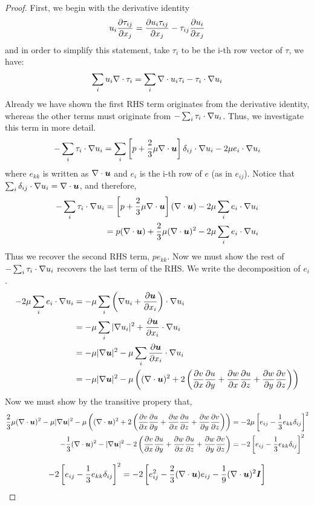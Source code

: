 \documentclass{article}
\begin{document}
\begin{proof}
    First, we begin with the derivative identity
    \begin{gather*}
        u_i\frac{\partial \tau_{ij}}{\partial x_j} = \frac{\partial u_i\tau_{ij}}{\partial x_j} - \tau_{ij}\frac{\partial u_i}{\partial x_j}
    \end{gather*}
    and in order to simplify this statement, take $\tau_i$ to be the i-th row
    vector of $\tau$, we have:
    \begin{gather*}
        \sum_i u_i\nabla \cdot{\tau_i} = \sum_i\nabla \cdot{u_i\tau_i} - \tau_i\cdot\nabla u_i
    \end{gather*}
    Already we have shown the first RHS term originates from the derivative
    identity, whereas the other terms must originate from
    $-\sum_i\tau_i\cdot\nabla u_i$. Thus, we investigate this term in more
    detail. 
    \begin{gather*}
        -\sum_i\tau_i\cdot\nabla u_i =\sum_i \left[p +
        \frac{2}{3}\mu\nabla\cdot\boldsymbol{u}\right]\delta_{ij}\cdot\nabla u_i - 2\mu
        e_i\cdot\nabla u_i
    \end{gather*}
    where $e_{kk}$ is written as $\nabla\cdot\boldsymbol{u}$ and $e_i$ is the i-th row of
    $e$ (as in $e_{ij}$). Notice that $\sum_{i}\delta_{ij}\cdot\nabla u_i =
    \nabla\cdot\boldsymbol{u}$, and therefore, 
    \begin{align*}
         -\sum_i\tau_i\cdot\nabla u_i &= \left[p +
        \frac{2}{3}\mu\nabla\cdot\boldsymbol{u}\right](\nabla\cdot\boldsymbol{u}) - 2\mu
        \sum_ie_i\cdot\nabla u_i\\
        &= p(\nabla \cdot{\boldsymbol{u}}) + \frac{2}{3}\mu(\nabla \cdot{\boldsymbol{u}})^2 - 2\mu
        \sum_ie_i\cdot\nabla u_i
    \end{align*}
    Thus we recover the second RHS term, $pe_{kk}$. Now we must show the rest of
    $-\sum_i\tau_i\cdot\nabla u_i$ recovers the last term of the RHS. We write
    the decomposition of $e_{i}$. 
    \begin{align*}
        -2\mu\sum_ie_i\cdot\nabla u_i &= -\mu\sum_i \left(\nabla u_i +
        \frac{\partial \boldsymbol{u}}{\partial x_i}\right)\cdot\nabla u_i\\
        &= -\mu \sum_i |\nabla u_i|^2 + \frac{\partial \boldsymbol{u}}{\partial x_i}\cdot\nabla u_i\\
        &= -\mu |\nabla\boldsymbol{u}|^2 - \mu\sum_i \frac{\partial \boldsymbol{u}}{\partial x_i}\cdot\nabla u_i\\
        &= -\mu |\nabla\boldsymbol{u}|^2 - \mu\left((\nabla\cdot\boldsymbol{u})^2 + 2\left(\frac{\partial v}{\partial x}\frac{\partial u}{\partial y}
        + \frac{\partial w}{\partial x}\frac{\partial u}{\partial z} + \frac{\partial w}{\partial y}\frac{\partial v}{\partial z}\right)\right)
    \end{align*}
    Now we must show by the transitive propery that,
    \begin{align*}
        \frac{2}{3}\mu(\nabla \cdot{\boldsymbol{u}})^2 - \mu |\nabla\boldsymbol{u}|^2 - \mu\left((\nabla\cdot\boldsymbol{u})^2 + 2\left(\frac{\partial v}{\partial x}\frac{\partial u}{\partial y}
        + \frac{\partial w}{\partial x}\frac{\partial u}{\partial z} + \frac{\partial w}{\partial y}\frac{\partial v}{\partial z}\right)\right) &= -
        2\mu\left[e_{ij} - \frac{1}{3}e_{kk}\delta_{ij}\right]^2\\
        -\frac{1}{3}(\nabla \cdot{\boldsymbol{u}})^2 - |\nabla\boldsymbol{u}|^2 - 2\left(\frac{\partial v}{\partial x}\frac{\partial u}{\partial y}
        + \frac{\partial w}{\partial x}\frac{\partial u}{\partial z} + \frac{\partial w}{\partial y}\frac{\partial v}{\partial z}\right) &= -
        2\left[e_{ij} - \frac{1}{3}e_{kk}\delta_{ij}\right]^2
    \end{align*}

    \begin{gather*}
        -2\left[e_{ij} - \frac{1}{3}e_{kk}\delta_{ij}\right]^2=-2\left[e_{ij}^2 - \frac{2}{3}(\nabla \cdot{\boldsymbol{u}})e_{ij} -
        \frac{1}{9}(\nabla \cdot{\boldsymbol{u}})^2\boldsymbol{I}\right]
    \end{gather*}
\end{proof}
\end{document}
